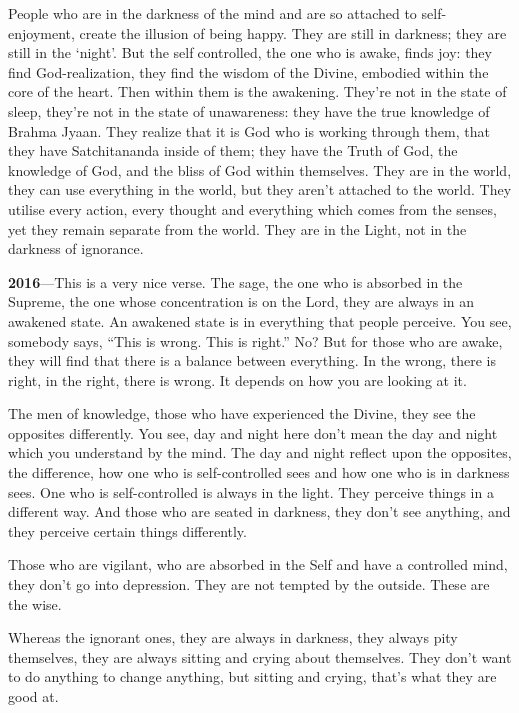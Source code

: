 People who are in the darkness of the mind and are so attached to self-enjoyment, create the illusion of being happy. They are still in darkness; they are still in the ‘night’. But the selfcontrolled, the one who is awake, finds joy: they find God-realization, they find the wisdom of the Divine, embodied within the core of the heart. Then within them is the awakening. They’re not in the state of sleep, they’re not in the state of unawareness: they have the true knowledge of Brahma Jyaan. They realize that it is God who is working through them, that they have Satchitananda inside of them; they have the Truth of God, the knowledge of God, and the bliss of God within themselves. They are in the world, they can use everything in the world, but they aren’t attached to the world. They utilise every action, every thought and everything which comes from the senses, yet they remain separate from the world. They are in the Light, not in the darkness of ignorance.

\textbf{2016}---This is a very nice verse. The sage, the one who is absorbed in the Supreme, the one whose concentration is on the Lord, they are always in an awakened state. An awakened state is in everything that people perceive. You see, somebody says, “This is wrong. This is right.” No? But for those who are awake, they will find that there is a balance between everything. In the wrong, there is right, in the right, there is wrong. It depends on how you are looking at it.

The men of knowledge, those who have experienced the Divine, they see the opposites differently. You see, day and night here don’t mean the day and night which you understand by the mind. The day and night reflect upon the opposites, the difference, how one who is self-controlled sees and how one who is in darkness sees. One who is self-controlled is always in the light. They perceive things in a different way. And those who are seated in darkness, they don’t see anything, and they perceive certain things differently.

Those who are vigilant, who are absorbed in the Self and have a controlled mind, they don’t go into depression. They are not tempted by the outside. These are the wise.

Whereas the ignorant ones, they are always in darkness, they always pity themselves, they are always sitting and crying about themselves. They don’t want to do anything to change anything, but sitting and crying, that’s what they are good at.

